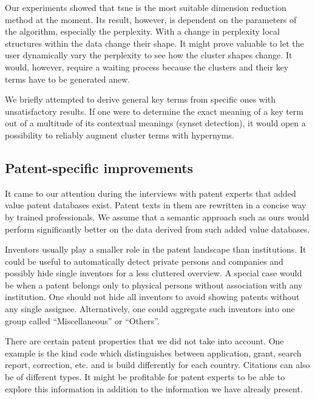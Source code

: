 Our experiments showed that \gls{tsne} is the most suitable dimension reduction method at the moment.
Its result, however, is dependent on the parameters of the algorithm, especially the perplexity.
With a change in perplexity local structures within the data change their shape.
It might prove valuable to let the user dynamically vary the perplexity to see how the cluster shapes change.
It would, however, require a waiting process because the clusters and their key terms have to be generated anew.

We briefly attempted to derive general key terms from specific ones with unsatisfactory results.
If one were to determine the exact meaning of a key term out of a multitude of its contextual meanings (synset detection), it would open a possibility to reliably augment cluster terms with hypernyms.

\subsection{Patent-specific improvements}

It came to our attention during the interviews with patent experts that added value patent databases exist.
Patent texts in them are rewritten in a concise way by trained professionals.
We assume that a semantic approach such as ours would perform significantly better on the data derived from such added value databases.

Inventors usually play a smaller role in the patent landscape than institutions.
It could be useful to automatically detect private persons and companies and possibly hide single inventors for a less cluttered overview.
A special case would be when a patent belongs only to physical persons without association with any institution. 
One should not hide all inventors to avoid showing patents without any single assignee.
Alternatively, one could aggregate such inventors into one group called ``Miscellaneous'' or ``Others''.

There are certain patent properties that we did not take into account.
One example is the kind code which distinguishes between application, grant, search report, correction, etc. and is build differently for each country.
Citations can also be of different types.
It might be profitable for patent experts to be able to explore this information in addition to the information we have already present.
 
